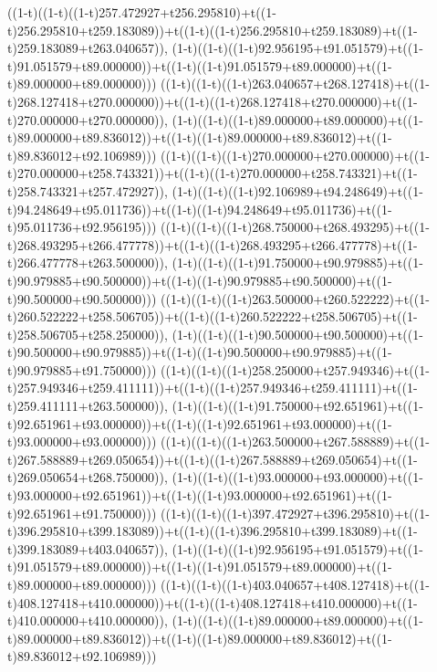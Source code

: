 ((1-t)((1-t)((1-t)257.472927+t256.295810)+t((1-t)256.295810+t259.183089))+t((1-t)((1-t)256.295810+t259.183089)+t((1-t)259.183089+t263.040657)),                                     (1-t)((1-t)((1-t)92.956195+t91.051579)+t((1-t)91.051579+t89.000000))+t((1-t)((1-t)91.051579+t89.000000)+t((1-t)89.000000+t89.000000)))
((1-t)((1-t)((1-t)263.040657+t268.127418)+t((1-t)268.127418+t270.000000))+t((1-t)((1-t)268.127418+t270.000000)+t((1-t)270.000000+t270.000000)),                                     (1-t)((1-t)((1-t)89.000000+t89.000000)+t((1-t)89.000000+t89.836012))+t((1-t)((1-t)89.000000+t89.836012)+t((1-t)89.836012+t92.106989)))
((1-t)((1-t)((1-t)270.000000+t270.000000)+t((1-t)270.000000+t258.743321))+t((1-t)((1-t)270.000000+t258.743321)+t((1-t)258.743321+t257.472927)),                                     (1-t)((1-t)((1-t)92.106989+t94.248649)+t((1-t)94.248649+t95.011736))+t((1-t)((1-t)94.248649+t95.011736)+t((1-t)95.011736+t92.956195)))
((1-t)((1-t)((1-t)268.750000+t268.493295)+t((1-t)268.493295+t266.477778))+t((1-t)((1-t)268.493295+t266.477778)+t((1-t)266.477778+t263.500000)),                                     (1-t)((1-t)((1-t)91.750000+t90.979885)+t((1-t)90.979885+t90.500000))+t((1-t)((1-t)90.979885+t90.500000)+t((1-t)90.500000+t90.500000)))
((1-t)((1-t)((1-t)263.500000+t260.522222)+t((1-t)260.522222+t258.506705))+t((1-t)((1-t)260.522222+t258.506705)+t((1-t)258.506705+t258.250000)),                                     (1-t)((1-t)((1-t)90.500000+t90.500000)+t((1-t)90.500000+t90.979885))+t((1-t)((1-t)90.500000+t90.979885)+t((1-t)90.979885+t91.750000)))
((1-t)((1-t)((1-t)258.250000+t257.949346)+t((1-t)257.949346+t259.411111))+t((1-t)((1-t)257.949346+t259.411111)+t((1-t)259.411111+t263.500000)),                                     (1-t)((1-t)((1-t)91.750000+t92.651961)+t((1-t)92.651961+t93.000000))+t((1-t)((1-t)92.651961+t93.000000)+t((1-t)93.000000+t93.000000)))
((1-t)((1-t)((1-t)263.500000+t267.588889)+t((1-t)267.588889+t269.050654))+t((1-t)((1-t)267.588889+t269.050654)+t((1-t)269.050654+t268.750000)),                                     (1-t)((1-t)((1-t)93.000000+t93.000000)+t((1-t)93.000000+t92.651961))+t((1-t)((1-t)93.000000+t92.651961)+t((1-t)92.651961+t91.750000)))
((1-t)((1-t)((1-t)397.472927+t396.295810)+t((1-t)396.295810+t399.183089))+t((1-t)((1-t)396.295810+t399.183089)+t((1-t)399.183089+t403.040657)),                                     (1-t)((1-t)((1-t)92.956195+t91.051579)+t((1-t)91.051579+t89.000000))+t((1-t)((1-t)91.051579+t89.000000)+t((1-t)89.000000+t89.000000)))
((1-t)((1-t)((1-t)403.040657+t408.127418)+t((1-t)408.127418+t410.000000))+t((1-t)((1-t)408.127418+t410.000000)+t((1-t)410.000000+t410.000000)),                                     (1-t)((1-t)((1-t)89.000000+t89.000000)+t((1-t)89.000000+t89.836012))+t((1-t)((1-t)89.000000+t89.836012)+t((1-t)89.836012+t92.106989)))
